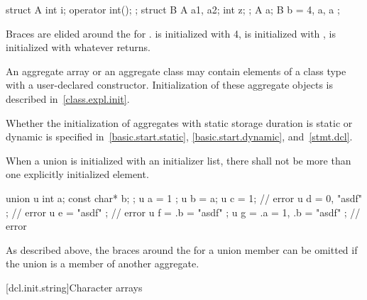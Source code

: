 \begin{example}
\begin{codeblock}
struct A {
  int i;
  operator int();
};
struct B {
  A a1, a2;
  int z;
};
A a;
B b = { 4, a, a };
\end{codeblock}

Braces are elided around the
for
.
is initialized with 4,
is initialized with
,
is initialized with whatever
returns.
\end{example}

\pnum
{}%
\begin{note}
An aggregate array or an aggregate class may contain elements of a
class type with a user-declared constructor.
Initialization of these aggregate objects is described in~\ref{class.expl.init}.
\end{note}

\pnum
\begin{note}
Whether the initialization of aggregates with static storage duration
is static or dynamic is specified
in~\ref{basic.start.static}, \ref{basic.start.dynamic}, and~\ref{stmt.dcl}.
\end{note}

\pnum
{}%
When a union is initialized with an initializer list,
there shall not be more than one
explicitly initialized element.
\begin{example}
\begin{codeblock}
union u { int a; const char* b; };
u a = { 1 };
u b = a;
u c = 1;                        // error
u d = { 0, "asdf" };            // error
u e = { "asdf" };               // error
u f = { .b = "asdf" };
u g = { .a = 1, .b = "asdf" };  // error
\end{codeblock}
\end{example}

\pnum
\begin{note}
As described above,
the braces around the
for a union member can be omitted if the
union is a member of another aggregate.
\end{note}

[dcl.init.string]{Character arrays}%

